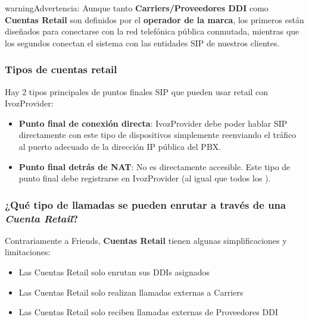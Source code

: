 \documentclass[letterpaper,10pt,spanish]{sphinxmanual}
\begin{document}
\begin{notice}{warning}{Advertencia:}
Aunque tanto \textbf{Carriers/Proveedores DDI} como \textbf{Cuentas Retail} son definidos por el \textbf{operador de la marca}, los primeros están diseñados para conectarse con la red telefónica pública conmutada, mientras que los segundos conectan el sistema con las entidades SIP de nuestros clientes.
\end{notice}


\subsubsection{Tipos de cuentas retail}
\label{administration_portal/client/retail/retail_accounts:types-of-retail-accounts}
Hay 2 tipos principales de puntos finales SIP que pueden usar retail con IvozProvider:
\begin{itemize}
\item {} 
\textbf{Punto final de conexión directa}: IvozProvider debe poder hablar SIP directamente con este tipo de dispositivos simplemente reenviando el tráfico al puerto adecuado de la dirección IP pública del PBX.

\item {} 
\textbf{Punto final detrás de NAT}: No es directamente accesible. Este tipo de punto final debe registrarse en IvozProvider (al igual que todos los {\hyperref[administration_portal/client/vpbx/terminals:terminals]{}}).

\end{itemize}


\subsubsection{¿Qué tipo de llamadas se pueden enrutar a través de una \emph{Cuenta Retail}?}
\label{administration_portal/client/retail/retail_accounts:what-kind-of-calls-can-be-routed-through-a-retail-account}
Contrariamente a Friends, \textbf{Cuentas Retail} tienen algunas simplificaciones y limitaciones:
\begin{itemize}
\item {} 
Las Cuentas Retail solo enrutan sus DDIs asignados

\item {} 
Las Cuentas Retail solo realizan llamadas externas a Carriers

\item {} 
Las Cuentas Retail solo reciben llamadas externas de Proveedores DDI

\end{itemize}
\end{document}
